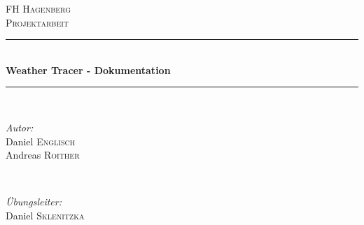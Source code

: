 \documentclass[12pt, letterpaper]{article}
\begin{document}

\begin{titlepage} %
\newcommand{\HRule}{\rule{\linewidth}{0.5mm}} %

\center %
 

\textsc{\LARGE FH Hagenberg}\\[1.5cm] %
\textsc{\Large Projektarbeit}\\[0.5cm] %


\HRule \\[0.4cm]
{ \huge \bfseries Weather Tracer - Dokumentation}\\[0.4cm] %
\HRule \\[1.5cm]
 

\begin{minipage}{0.4\textwidth}
\begin{flushleft} \large
\emph{Autor:}\\
Daniel \textsc{Englisch}\\ %
Andreas \textsc{Roither} %
\end{flushleft}
\end{minipage}
~
\begin{minipage}{0.4\textwidth}
\begin{flushright} \large
\emph{Übungsleiter:} \\
Daniel \textsc{Sklenitzka} %
\end{flushright}
\end{minipage}\\[2cm]


\end{titlepage}
\end{document}
